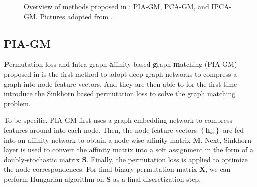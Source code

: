 \documentclass[a4paper]{article}
\newcommand{\set}[1]{\left\{#1\right\}}
\begin{document}
\begin{figure}[htb]
    \centering


    \caption{Overview of methods proposed in \cite{pca-ipca}: PIA-GM, PCA-GM, and IPCA-GM. Pictures adopted from \cite{pca-ipca}.}
\end{figure}

\subsection{PIA-GM}
\textbf{P}ermutation loss and \textbf{i}ntra-graph \textbf{a}ffinity based \textbf{g}raph \textbf{m}atching (PIA-GM) proposed in \cite{pca-ipca} is the first method to adopt deep graph networks to compress a graph into node feature vectors. And they are then able to for the first time introduce the Sinkhorn \cite{sinkhorn} based permutation loss to solve the graph matching problem.

To be specific, PIA-GM first uses a graph embedding network to compress features around into each node. Then, the node feature vectors $\set{\mathbf{h}_{si}}$ are fed into an affinity network to obtain a node-wise affinity matrix $\mathbf{M}$. Next, Sinkhorn layer is used to convert the affinity matrix into a soft assignment in the form of a doubly-stochastic matrix $\mathbf{S}$. Finally, the permutation loss is applied to optimize the node correspondences. For final binary permutation matrix $\mathbf{X}$, we can perform Hungarian \cite{hungarian} algorithm on $\mathbf{S}$ as a final discretization step.
\end{document}

